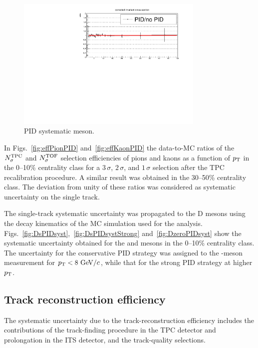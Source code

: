 \begin{figure}[tb]
\begin{center}
 \includegraphics[width=0.8\textwidth]{figures/Dstar/pp13TeV/cross-section-ratio_PID_noPID-updated.pdf}
\caption{PID systematic \Dstar meson.}
\label{fig:NsigmaTPCuncorr18q}
\end{center}
\end{figure}


In Figs.~\ref{fig:effPionPID} and~\ref{fig:effKaonPID} the data-to-MC ratios of the $N_{\sigma}^{\rm TPC}$ and $N_{\sigma}^{\rm TOF}$ selection efficiencies of pions and kaons as a function of $p_{\rm T}$ in the 0--10\% centrality class for a $3\,\sigma$, $2\,\sigma$, and $1\,\sigma$ selection after the TPC recalibration procedure. A similar result was obtained in the 30--50\% centrality class. The deviation from unity of these ratios was considered as systematic uncertainty on the single track. 


The single-track systematic uncertainty was propagated to the D mesons using the decay kinematics of the MC simulation used for the analysis. Figs.~\ref{fig:DsPIDsyst},~\ref{fig:DsPIDsystStrong} and~\ref{fig:DzeroPIDsyst} show the systematic uncertainty obtained for the \Dsubs and \Dzero mesons in the 0--10\% centrality class. The uncertainty for the conservative PID strategy was assigned to the \Dsubs-meson measurement for $p_{\rm T}<8~{\rm GeV}/c$, while that for the strong PID strategy at higher $p_{\rm T}$. 


\clearpage
\subsection{Track reconstruction efficiency}

The systematic uncertainty due to the track-reconstruction efficiency includes the contributions of the track-finding procedure in the TPC detector and prolongation in the ITS detector, and the track-quality selections. 

